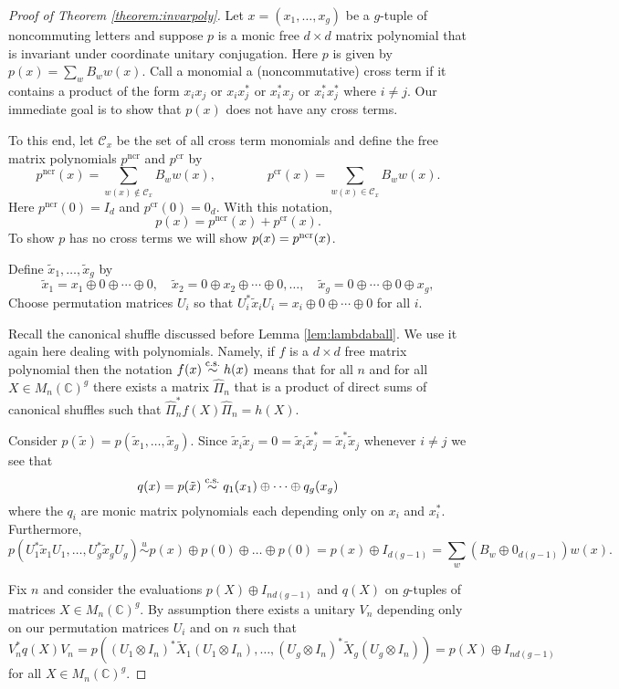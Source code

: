 \documentclass[12pt,makeidx]{amsart}
\newcommand{\simu}{\stackrel u{\sim}}
\def\beq{\begin{equation}}
\def\eeq{\end{equation}}
\numberwithin{equation}{section}
\def\C{ {\mathbb{C}} }
\def\cC{ {\mathcal C} }
\def\cs{\stackrel{\rm c.s.}{\sim}}
\begin{document}
\begin{proof}[Proof of Theorem \ref{theorem:invarpoly}]
Let $x=(x_1, \dots, x_g)$ be a $g$-tuple of noncommuting letters and suppose $p$ is a monic  free $d \times d$ matrix polynomial that is invariant under coordinate unitary conjugation. Here $p$ is given by $p(x)=\sum_w B_w w(x)$. Call a monomial a (noncommutative) cross term if it contains a product of the form $x_i x_j$ or $x_ix_j^*$ or $x_i^*x_j$ or $x_i^*x_j^*$ where $i \neq j$.
Our immediate goal is to show that $p(x)$ does not have any cross terms.

To this end, let $\mathcal{C}_x$ be the
 set of all cross term monomials
and define the free matrix polynomials $p^{\mathrm{ncr}}$ and $p^{\mathrm{cr}}$ by 
\beq
\label{eq:pCRpNCRdefinitions}
p^{\mathrm{ncr}} (x)=\sum_{w(x) \notin \cC_x} B_w w(x), \quad \quad \quad \quad
p^{\mathrm{cr}} (x)=\sum_{w(x) \in \cC_x} B_w  w(x).
\eeq
Here $p^{\mathrm{ncr}} (0)=I_d$ and $p^{\mathrm{cr}} (0)=0_d$. With this notation,
\beq
\label{eq:pCRpNCRform}
p(x)=p^{\mathrm{ncr}} (x)+p^{\mathrm{cr}} (x).
\eeq
To show $p$ has no cross terms we will show $p(x)=p^{\rm ncr} (x)$. 

Define $\tilde{x}_1, \dots, \tilde{x}_g$ by
\[
\tilde{x}_1=
x_1 \oplus 0 \oplus \cdots \oplus 0, \quad
\tilde{x}_2=0 \oplus x_2 \oplus \cdots\oplus 0, \ldots,\quad
   \tilde{x}_g=0\oplus \cdots\oplus 0\oplus x_g, \]
Choose permutation matrices $U_i$ so that
$
U_i^* \tilde{x}_i U_i=
x_i\oplus 0 \oplus \cdots \oplus 0
$
for all $i$. 

Recall the canonical shuffle discussed before Lemma \ref{lem:lambdaball}. We use it again here dealing with polynomials. Namely,
if $f$ is a $d \times d$ free matrix polynomial then the notation $f(x) \cs h(x)$ means that for all $n$ and for all $X \in M_n(\C)^g$ there exists a matrix $\hat{\Pi}_n$ that is a product of direct sums of canonical shuffles such that $\hat{\Pi}_n^* f(X) \hat{\Pi}_n=h(X)$.


Consider $p(\tilde{x})=p(\tilde{x}_1, \dots, \tilde{x}_g)$. Since $\tilde{x}_i \tilde{x}_j=0=\tilde{x}_i \tilde{x}_j^*=\tilde{x}_i^* \tilde{x}_j$ whenever $i \neq j$ we  see that
\[
q(x)=p(\tilde{x}) \cs q_1 (x_1) \oplus \dots \oplus q_g (x_g)
\]
where the $q_i$ are monic matrix polynomials each depending only on $x_i$ and $x_i^*$. Furthermore,
\[
p(U_1^* \tilde{x}_1 U_1, \dots, U_g^* \tilde{x}_g U_g) \simu  p(x) \oplus p(0) \oplus \dots \oplus p(0) =p(x) \oplus I_{d(g-1)}=\sum_w (B_w \oplus 0_{d(g-1)}) w(x).
\]

Fix $n$ and consider the evaluations $p(X) \oplus I_{nd(g-1)}$ and $q(X)$ on $g$-tuples of matrices $X \in M_n(\C)^g$. By assumption there exists a unitary $V_n$ depending only on our permutation matrices $U_i$ and on $n$ such that 
\beq
\label{eq:qpequality}
V_n^* q(X) V_n=p((U_1 \otimes I_n)^* \tilde{X}_1 (U_1 \otimes I_n), \dots, (U_g \otimes I_n)^* \tilde{X}_g (U_g \otimes I_n))
=p(X)\oplus I_{nd(g-1)}
\eeq
for all $X \in M_n(\C)^g$. 



\end{proof}
\end{document}
